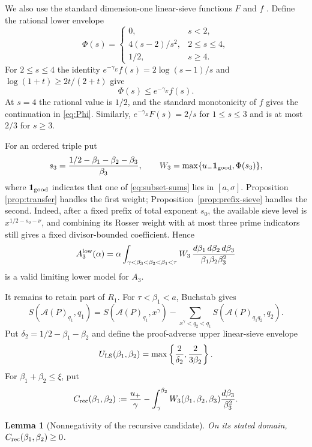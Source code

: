 \documentclass[10pt,reqno]{amsart}
\newcommand{\Acal}{\mathcal{A}}
\newcommand{\1}{\mathbf{1}}
\theoremstyle{plain}
\newtheorem{lemma}[theorem]{Lemma}
\theoremstyle{remark}
\begin{document}
We also use the standard dimension-one linear-sieve functions $F$ and $f$
\cite[Chapter 12]{FriedlanderIwaniec2010}.  Define the rational lower
envelope
\begin{equation}\label{eq:Phi}
 \Phi(s)=
 \begin{cases}
  0,&s<2,\\
  4(s-2)/s^2,&2\le s\le4,\\
  1/2,&s\ge4.
 \end{cases}
\end{equation}
For $2\le s\le4$ the identity
$e^{-\gamma_E}f(s)=2\log(s-1)/s$ and
$\log(1+t)\ge2t/(2+t)$ give
\begin{equation}\label{eq:Phi-lower}
 \Phi(s)\le e^{-\gamma_E}f(s).
\end{equation}
At $s=4$ the rational value is $1/2$, and the standard monotonicity of $f$
gives the continuation in \eqref{eq:Phi}.  Similarly,
$e^{-\gamma_E}F(s)=2/s$ for $1\le s\le3$ and is at most $2/3$ for
$s\ge3$.

For an ordered triple put
\[
 s_3=\frac{1/2-\beta_1-\beta_2-\beta_3}{\beta_3},
 \qquad
 W_3=\max\{u_-\1_{\rm good},\Phi(s_3)\},
\]
where $\1_{\rm good}$ indicates that one of \eqref{eq:subset-sums} lies in
$[a,\sigma]$.  Proposition \ref{prop:transfer} handles the first weight;
Proposition~\ref{prop:prefix-sieve} handles the second.  Indeed, after a
fixed prefix of total exponent $s_0$, the available sieve level is
$x^{1/2-s_0-\nu}$, and combining its Rosser weight with at most three prime
indicators still gives a fixed divisor-bounded coefficient.  Hence
\begin{equation}\label{eq:A3lower}
 A_3^{\rm low}(\alpha)=\alpha
 \int_{\gamma<\beta_3<\beta_2<\beta_1<\tau}
 W_3\,\frac{d\beta_1\,d\beta_2\,d\beta_3}
 {\beta_1\beta_2\beta_3^2}
\end{equation}
is a valid limiting lower model for $A_3$.

It remains to retain part of $R_1$.  For $\tau<\beta_1<a$, Buchstab gives
\[
 S(\Acal(P)_{q_1},q_1)
 =S(\Acal(P)_{q_1},x^\gamma)
  -\sum_{x^\gamma<q_2<q_1}S(\Acal(P)_{q_1q_2},q_2).
\]
Put $\delta_2=1/2-\beta_1-\beta_2$ and define the proof-adverse upper
linear-sieve envelope
\[
 U_{\rm LS}(\beta_1,\beta_2)
 =\max\left\{\frac2{\delta_2},\frac2{3\beta_2}\right\}.
\]
For $\beta_1+\beta_2\le\xi$, put
\[
 C_{\rm rec}(\beta_1,\beta_2)
 :=\frac{u_+}{\gamma}
   -\int_\gamma^{\beta_2}
      W_3(\beta_1,\beta_2,\beta_3)\frac{d\beta_3}{\beta_3^2}.
\]

\begin{lemma}[Nonnegativity of the recursive candidate]
\label{lem:recursive-candidate-nonnegative}
On its stated domain, $C_{\rm rec}(\beta_1,\beta_2)\ge0$.
\end{lemma}
\end{document}
